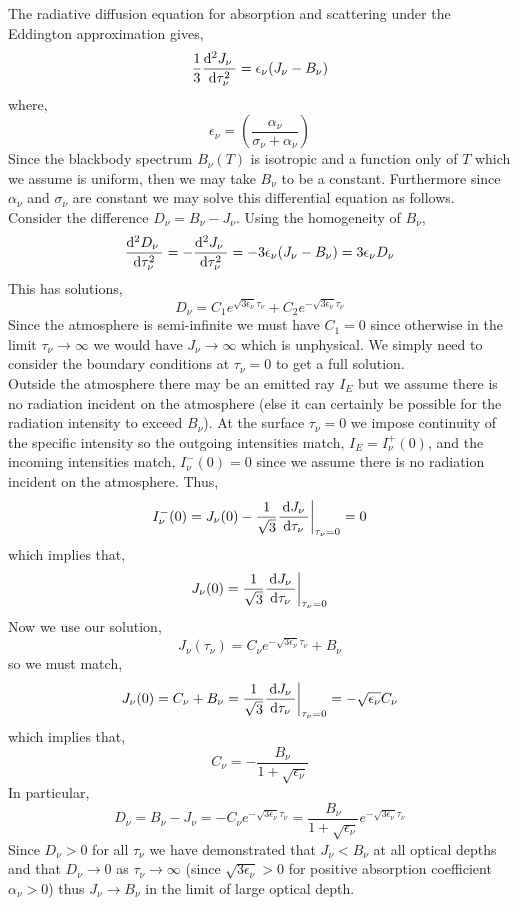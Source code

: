 \documentclass[12pt]{article}
\begin{document}
The radiative diffusion equation for absorption and scattering under the Eddington approximation gives,
\[ \frac{1}{3} \frac{\mathrm{d}^{2} J_\nu \:}{\: \mathrm{d}\tau_\nu^{2} \:} = \epsilon_\nu (J_\nu - B_\nu) \]
where,
\[ \epsilon_\nu = \left( \frac{\alpha_\nu}{\sigma_\nu + \alpha_\nu} \right) \]
Since the blackbody spectrum $B_\nu(T)$ is isotropic and a function only of $T$ which we assume is uniform, then we may take $B_\nu$ to be a constant. Furthermore since $\alpha_\nu$ and $\sigma_\nu$ are constant we may solve this differential equation as follows. Consider the difference $D_\nu = B_\nu - J_\nu$. Using the homogeneity of $B_\nu$,
\[ \frac{\mathrm{d}^{2} D_\nu \:}{\: \mathrm{d}\tau_\nu^{2} \:} = - \frac{\mathrm{d}^{2} J_\nu \:}{\: \mathrm{d}\tau_\nu^{2} \:} = - 3 \epsilon_\nu (J_\nu - B_\nu) = 3 \epsilon_\nu D_\nu \]
This has solutions,
\[ D_\nu = C_1 e^{\sqrt{3 \epsilon_\nu} \tau_\nu} + C_2 e^{-\sqrt{3 \epsilon_\nu} \tau_\nu} \]
Since the atmosphere is semi-infinite we must have $C_1 = 0$ since otherwise in the limit $\tau_\nu \to \infty$ we would have $J_\nu \to \infty$ which is unphysical. We simply need to consider the boundary conditions at $\tau_\nu = 0$ to get a full solution. 
\bigskip\\
Outside the atmosphere there may be an emitted ray $I_E$ but we assume there is no radiation incident on the atmosphere (else it can certainly be possible for the radiation intensity to exceed $B_\nu$).
At the surface $\tau_\nu = 0$ we impose continuity of the specific intensity so the outgoing intensities match, $I_E = I^+_\nu(0)$, and the incoming intensities match, $I^-_\nu(0) = 0$ since we assume there is no radiation incident on the atmosphere. Thus,
\[ I^{-}_\nu(0) = J_\nu(0) - \frac{1}{\sqrt{3}} \frac{\: \mathrm{d}J_\nu \:}{\: \mathrm{d}\tau_\nu \:} \bigg|_{\tau_\nu = 0} = 0 \]
which implies that,
\[ J_\nu(0) = \frac{1}{\sqrt{3}} \frac{\: \mathrm{d}J_\nu \:}{\: \mathrm{d}\tau_\nu \:} \bigg|_{\tau_\nu = 0} \]
Now we use our solution,
\[ J_\nu(\tau_\nu) = C_\nu e^{-\sqrt{3 \epsilon_\nu} \tau_\nu} + B_\nu \]
so we must match,
\[ J_\nu(0) = C_\nu + B_\nu = \frac{1}{\sqrt{3}}  \frac{\: \mathrm{d}J_\nu \:}{\: \mathrm{d}\tau_\nu \:} \bigg|_{\tau_\nu = 0} = - \sqrt{\epsilon_\nu} C_\nu \]
which implies that,
\[ C_\nu = - \frac{B_\nu}{1 + \sqrt{\epsilon_\nu}} \]
In particular,
\[ D_\nu = B_
\nu - J_\nu = - C_\nu e^{-\sqrt{3 \epsilon_\nu} \tau_\nu} = \frac{B_\nu}{1 + \sqrt{\epsilon_\nu}} e^{-\sqrt{3 \epsilon_\nu} \tau_\nu}  \]
Since $D_\nu > 0$ for all $\tau_\nu$ we have demonstrated that $J_\nu < B_\nu$ at all optical depths and that $D_\nu \to 0$ as $\tau_\nu \to \infty$ (since $\sqrt{3 \epsilon_\nu} > 0$ for positive absorption coefficient $\alpha_\nu > 0$) thus $J_\nu \to B_\nu$ in the limit of large optical depth.  
\end{document}
